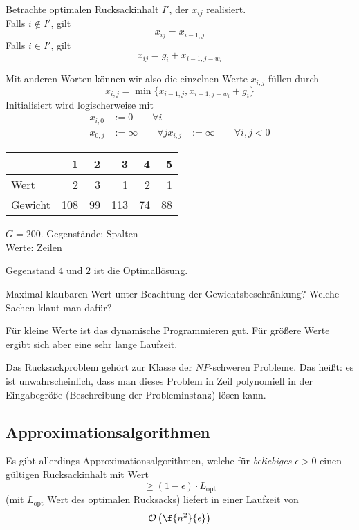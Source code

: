 \documentclass{mycourse}
\renewcommand{\O}{\mathcal{O}}
\begin{document}
Betrachte optimalen Rucksackinhalt $I'$, der $x_{ij}$ realisiert.\\
Falls $i\not\in I'$, gilt 
\[
	x_{ij}= x_{i-1,j}
\]
Falls $i\in I'$, gilt 
\[
	x_{ij} = g_i + x_{i-1,j-w_i}
\]

Mit anderen Worten können wir also die einzelnen Werte $x_{i,j}$ füllen durch
\[
	x_{i,j} = \min\{x_{i-1,j}, x_{i-1,j-w_i} + g_i\}
\]
Initialisiert wird logischerweise mit
\begin{align*}
	x_{i,0} &:= 0 \qquad \forall i\\
	x_{0,j} &:= \infty \qquad \forall j
	x_{i,j} &:= \infty \qquad \forall i,j < 0
\end{align*}

\begin{ex}
	\begin{tabular}{l|rrrrr}
		~ & 1 & 2 & 3 & 4 & 5 \\
		\hline
		Wert&2 & 3 & 1 & 2 & 1\\
		Gewicht&108 & 99 & 113 & 74 & 88
	\end{tabular}
	$G=200$.
	Gegenstände: Spalten\\
	Werte: Zeilen

	Gegenstand $4$ und $2$ ist die Optimallösung.

\end{ex}

Maximal klaubaren Wert unter Beachtung der Gewichtsbeschränkung?
Welche Sachen klaut man dafür? 

\begin{note}
	Für kleine Werte ist das dynamische Programmieren gut.
	Für größere Werte ergibt sich aber eine sehr lange Laufzeit.
\end{note}

Das Rucksackproblem gehört zur Klasse der $NP$-schweren Probleme.
Das heißt: es ist unwahrscheinlich, dass man dieses Problem in Zeil polynomiell in der Eingabegröße (Beschreibung der Probleminstanz) lösen kann.


\subsection{Approximationsalgorithmen}

Es gibt allerdings Approximationsalgorithmen, welche für \emph{beliebiges} $\epsilon > 0$ einen gültigen Rucksackinhalt mit Wert
\[
	\ge (1-\epsilon)\cdot L_{\text{opt}}
\]
(mit $L_{\text{opt}}$ Wert des optimalen Rucksacks)
liefert in einer Laufzeit von
\[
	\O\left( \f{n^2}{\epsilon}\right)
\]
\end{document}
